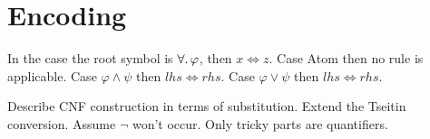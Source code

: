 \section{Encoding}

In the case the root 
symbol is \( \forall \ldotp \varphi \), then \( x \Leftrightarrow z \). 
Case Atom then no rule is applicable. Case \( \varphi \wedge \psi \) 
then \( \mathit{lhs} \Leftrightarrow \mathit{rhs} \). Case \( \varphi 
\vee \psi \) then \( \mathit{lhs} \Leftrightarrow \mathit{rhs} \).

Describe CNF construction in terms of substitution. Extend the Tseitin 
conversion. Assume \( \neg \) won't occur. Only tricky parts are 
quantifiers.
